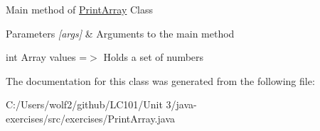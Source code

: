 Main method of \mbox{\hyperlink{classexercises_1_1_print_array}{Print\+Array}} Class 
\begin{DoxyParams}{Parameters}
{\em \mbox{[}args\mbox{]}} & Arguments to the main method \\
\hline
\end{DoxyParams}
int Array values =$>$ Holds a set of numbers 

The documentation for this class was generated from the following file\+:\begin{DoxyCompactItemize}
\item 
C\+:/\+Users/wolf2/github/\+L\+C101/\+Unit 3/java-\/exercises/src/exercises/Print\+Array.\+java\end{DoxyCompactItemize}
